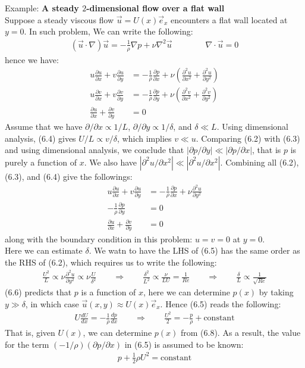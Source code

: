 \documentclass[11pt]{book}
\theoremstyle{break}
\theoremstyle{break}
\newcommand{\pd}{\partial}
\newcommand{\example}{\color{green}Example: \color{black}}
\begin{document}
\example \textbf{A steady $2$-dimensional flow over a flat wall}\\
Suppose a steady viscous flow $\vec{u} = U(x)\vec{e}_x$ encounters a flat wall located at $y=0$. In such problem, We can write the following:
\begin{align*}
(\vec{u}\cdot \nabla) \vec{u} = -\frac{1}{\rho}\nabla p + \nu \nabla^2 \vec{u} \qquad\qquad \nabla \cdot \vec{u} = 0
\end{align*}
hence we have:
\begin{align}
u\frac{\pd u}{\pd x} + v \frac{\pd u}{\pd y} &= -\frac{1}{\rho}\frac{\pd p}{\pd x} + \nu \left(\frac{\pd^2 u}{\pd x^2} + \frac{\pd^2 u}{\pd y^2}\right)\\
u \frac{\pd v}{\pd x} + v\frac{\pd v}{\pd y} &= -\frac{1}{\rho}\frac{\pd p}{\pd y} + \nu \left( \frac{\pd^2 v}{\pd x^2}+ \frac{\pd^2 v}{\pd y^2}\right) \\
\frac{\pd u}{\pd x} + \frac{\pd v}{\pd y} &= 0 
\end{align}
Assume that we have $\pd/\pd x \propto 1/L$, $\pd/\pd y \propto 1/\delta$, and $\delta\ll L$. Using dimensional analysis, (6.4) gives $U/L \propto v/\delta$, which implies $v\ll u$. Comparing (6.2) with (6.3) and using dimensional analysis, we conclude that $|\pd p/\pd y| \ll |\pd p / \pd x|$, that is $p$ is purely a function of $x$. We also have $|\pd^2 u / \pd x^2 | \ll |\pd^2 u / \pd x^2 |$. Combining all (6.2), (6.3), and (6.4) give the followings:
\begin{align}
u\frac{\pd u}{\pd x} + v \frac{\pd u}{\pd y} &= -\frac{1}{\rho}\frac{\pd p}{\pd x} + \nu \frac{\pd^2 u}{\pd y^2}\\
-\frac{1}{\rho}\frac{\pd p}{\pd y} &=0 \\
\frac{\pd u}{\pd x} + \frac{\pd v}{\pd y} &= 0 
\end{align}
along with the boundary condition in this problem: $u=v=0$ at $y=0$. \\

Here we can estimate $\delta$. We watn to have the LHS of (6.5) has the same order as the RHS of (6.2), which requires us to write the following:
\begin{align*}
\frac{U^2}{L}\propto \nu\frac{\pd^2 u}{\pd y^2} \propto\nu \frac{U}{\delta^2} \qquad \Rightarrow \qquad \frac{\delta^2}{L^2} \propto \frac{\nu}{LU} = \frac{1}{Re} \qquad \Rightarrow \qquad \frac{\delta}{L}\propto \frac{1}{\sqrt{
Re}}
\end{align*}
(6.6) predicts that $p$ is a function of $x$, here we can determine $p(x)$ by taking $y \gg \delta$, in which case $\vec{u}(x,y) \approx U(x)\vec{e}_x$. Hence (6.5) reads the following:
\begin{align}
U \frac{dU}{dx} = -\frac{1}{\rho}\frac{dp}{dx} \qquad \Rightarrow \qquad \frac{U^2}{2} = -\frac{p}{\rho} + \text{constant}
\end{align}
That is, given $U(x)$, we can determine $p(x)$ from (6.8). As a result, the value for the term $(-1/\rho)(\pd p/\pd x)$ in (6.5) is assumed to be known:
\begin{align*}
p + \frac{1}{2}\rho U^2 = \text{constant}
\end{align*}
\end{document}
